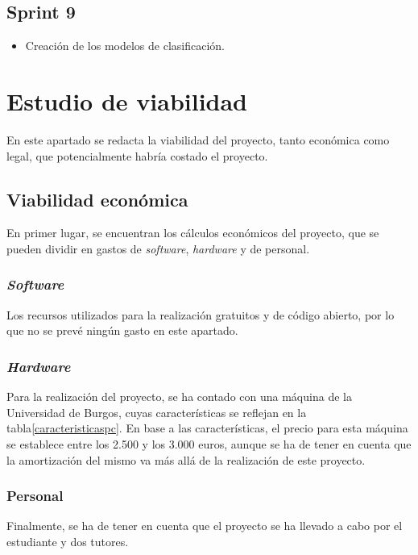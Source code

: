 \subsection{Sprint 9}

\begin{itemize}
\item Creación de los modelos de clasificación.
\end{itemize}

\section{Estudio de viabilidad}

En este apartado se redacta la viabilidad del proyecto, tanto económica como legal, que potencialmente habría costado el proyecto.

\subsection{Viabilidad económica}

En primer lugar, se encuentran los cálculos económicos del proyecto, que se pueden dividir en gastos de \textit{software}, \textit{hardware} y de personal.

\subsubsection{\textit{Software}}

Los recursos utilizados para la realización gratuitos y de código abierto, por lo que no se prevé ningún gasto en este apartado.

\subsubsection{\textit{Hardware}}

Para la realización del proyecto, se ha contado con una máquina de la Universidad de Burgos, cuyas características se reflejan en la tabla\ref{caracteristicaspc}.
En base a las características, el precio para esta máquina se establece entre los 2.500 y los 3.000 euros, aunque se ha de tener en cuenta que la amortización del mismo va más allá de la realización de este proyecto.

\subsubsection{Personal}

Finalmente, se ha de tener en cuenta que el proyecto se ha llevado a cabo por el estudiante y dos tutores.


